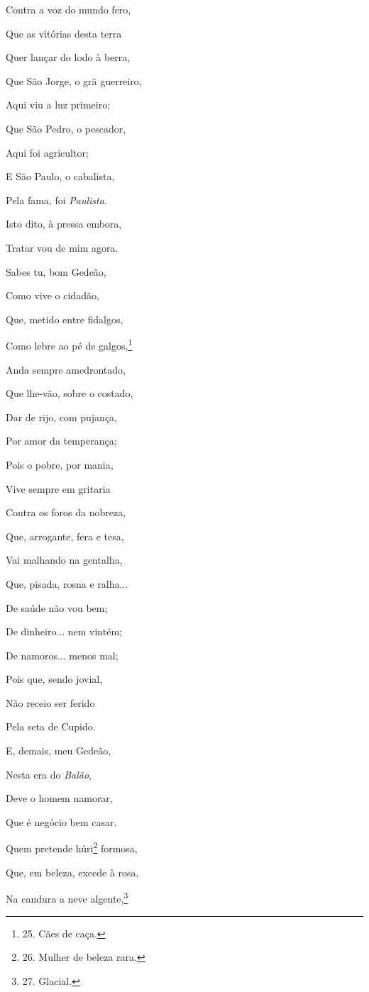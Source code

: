 Contra a voz do mundo fero,

Que as vitórias desta terra

Quer lançar do lodo à berra,

Que São Jorge, o grã guerreiro,

Aqui viu a luz primeiro;

Que São Pedro, o pescador,

Aqui foi agricultor;

E São Paulo, o cabalista,

Pela fama, foi \emph{Paulista}.

Isto dito, à pressa embora,

Tratar vou de mim agora.

Sabes tu, bom Gedeão,

Como vive o cidadão,

Que, metido entre fidalgos,

Como lebre ao pé de galgos,\footnote{25. Cães de caça.}

Anda sempre amedrontado,

Que lhe-vão, sobre o costado,

Dar de rijo, com pujança,

Por amor da temperança;

Pois o pobre, por mania,

Vive sempre em gritaria

Contra os foros da nobreza,

Que, arrogante, fera e tesa,

Vai malhando na gentalha,

Que, pisada, rosna e ralha...

De saúde não vou bem;

De dinheiro... nem vintém;

De namoros... menos mal;

Pois que, sendo jovial,

Não receio ser ferido

Pela seta de Cupido.

E, demais, meu Gedeão,

Nesta era do \emph{Balão},

Deve o homem namorar,

Que é negócio bem casar.

Quem pretende húri\footnote{26. Mulher de beleza rara.} formosa,

Que, em beleza, excede à rosa,

Na candura a neve algente,\footnote{27. Glacial.}

